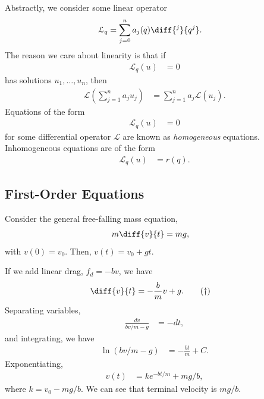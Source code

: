 \documentclass[10pt]{mypackage}
\begin{document}
  Abstractly, we consider some linear operator
  \begin{align*}
    \mathcal{L}_q &= \sum_{j=0}^{n}a_j(q)\diff{^j}{q^j}.
  \end{align*}
  The reason we care about linearity is that if
  \begin{align*}
    \mathcal{L}_q(u) &= 0
  \end{align*}
  has solutions $u_1,\dots,u_n$, then
  \begin{align*}
    \mathcal{L}\left( \sum_{j=1}^{n}a_ju_j \right) &=\sum_{j=1}^{n}a_j\mathcal{L}\left( u_j \right).
  \end{align*}
  Equations of the form
  \begin{align*}
    \mathcal{L}_q\left( u \right) &= 0
  \end{align*}
  for some differential operator $\mathcal{L}$ are known as \textit{homogeneous} equations. Inhomogeneous equations are of the form
  \begin{align*}
    \mathcal{L}_q\left( u \right) &= r\left( q \right).
  \end{align*}
  \subsection{First-Order Equations}%
  Consider the general free-falling mass equation,
  \begin{align*}
    m\diff{v}{t} &= mg,
  \end{align*}
  with $v(0) = v_0$. Then, $v(t) = v_0 + gt$.\newline

  If we add linear drag, $f_d = -bv$, we have
  \begin{align*}
    \diff{v}{t} &= -\frac{b}{m}v + g.\label{eq:linear_drag}\tag{\textdagger}
  \end{align*}
  Separating variables,
  \begin{align*}
    \frac{dv}{bv/m - g} &= -dt,
  \end{align*}
  and integrating, we have
  \begin{align*}
    \ln\left( bv/m - g \right) &= - \frac{bt}{m} + C.
  \end{align*}
  Exponentiating,
  \begin{align*}
    v(t) &= ke^{-bt/m} + mg/b,
  \end{align*}
  where $k = v_0 - mg/b$. We can see that terminal velocity is $mg/b$.\newline
\end{document}
